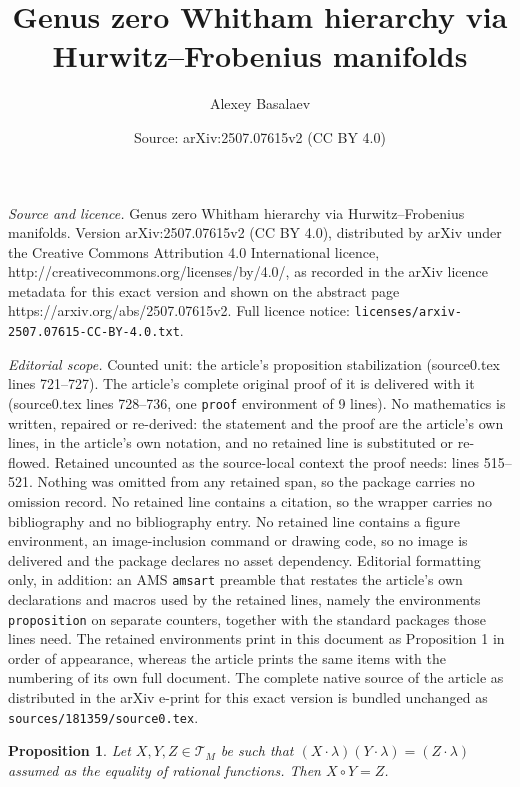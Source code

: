 \documentclass[10pt,a4paper]{amsart}
\title{Genus zero Whitham hierarchy via Hurwitz--Frobenius manifolds}
\author{Alexey Basalaev}
\date{Source: arXiv:2507.07615v2 (CC BY 4.0)}
\newtheorem{proposition}{Proposition}
\def\T{{\mathcal T}}
\begin{document}
\maketitle

\noindent\emph{Source and licence.} Genus zero Whitham hierarchy via Hurwitz--Frobenius manifolds. Version arXiv:2507.07615v2 (CC BY 4.0), distributed by arXiv under the Creative Commons Attribution 4.0 International licence, http://creativecommons.org/licenses/by/4.0/, as recorded in the arXiv licence metadata for this exact version and shown on the abstract page https://arxiv.org/abs/2507.07615v2. Full licence notice: \texttt{licenses/arxiv-2507.07615-CC-BY-4.0.txt}.\par\smallskip

\noindent\textit{Editorial scope.} Counted unit: the article's proposition stabilization (source0.tex lines 721--727). The article's complete original proof of it is delivered with it (source0.tex lines 728--736, one \texttt{proof} environment of 9 lines). No mathematics is written, repaired or re-derived: the statement and the proof are the article's own lines, in the article's own notation, and no retained line is substituted or re-flowed.  Retained uncounted as the source-local context the proof needs: lines 515--521.  Nothing was omitted from any retained span, so the package carries no omission record.  No retained line contains a citation, so the wrapper carries no bibliography and no bibliography entry.  No retained line contains a figure environment, an image-inclusion command or drawing code, so no image is delivered and the package declares no asset dependency.  Editorial formatting only, in addition: an AMS \texttt{amsart} preamble that restates the article's own declarations and macros used by the retained lines, namely the environments \texttt{proposition} on separate counters, together with the standard packages those lines need.  The retained environments print in this document as Proposition 1 in order of appearance, whereas the article prints the same items with the numbering of its own full document.  The complete native source of the article as distributed in the arXiv e-print for this exact version is bundled unchanged as \texttt{sources/181359/source0.tex}.
\begin{proposition}\label{prop: low ramification products}
  Let $X,Y,Z \in \T_M$ be such that $(X \cdot \lambda)(Y \cdot \lambda) = (Z \cdot \lambda)$
    assumed as the equality of rational functions. Then $X \circ Y = Z$.
\end{proposition}
\end{document}
